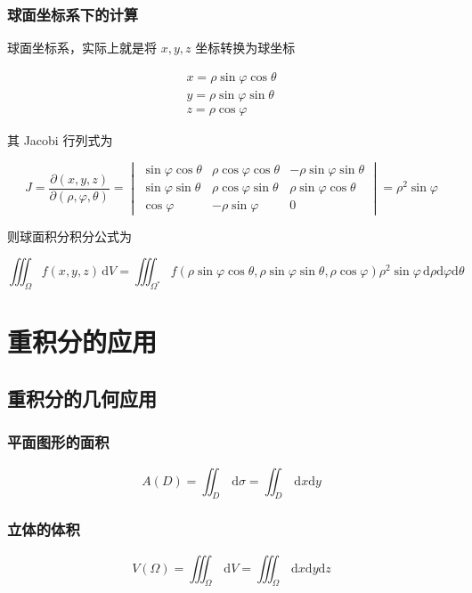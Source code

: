\documentclass[lang = zh , final , oneside , openany , titlepage , zihao = -4 , linespread = 1.3 , baselineskip = false , cjk-font = windows , text-font = newtx , math-font = newtx , math-style = ISO , uppercase-greek = upright , integral-limits = false]{sjtureport}
\begin{document}
\subsubsection{球面坐标系下的计算}

球面坐标系，实际上就是将 \(x,y,z\) 坐标转换为球坐标

\[\begin{aligned}
x = \rho\sin\varphi\cos\theta\\
y = \rho\sin\varphi\sin\theta\\
z = \rho\cos\varphi
\end{aligned}\]

其 Jacobi 行列式为

\[J = \frac{\partial (x,y,z)}{\partial (\rho,\varphi,\theta)} = \begin{vmatrix}
\sin\varphi\cos\theta & \rho\cos\varphi\cos\theta & -\rho\sin\varphi\sin\theta\\
\sin\varphi\sin\theta & \rho\cos\varphi\sin\theta & \rho\sin\varphi\cos\theta\\
\cos\varphi & -\rho\sin\varphi & 0
\end{vmatrix} = \rho^2\sin\varphi\]

则球面积分积分公式为

\[\iiint_\Omega f(x,y,z)\,\mathrm{d}V = \iiint_{\Omega^*} f(\rho\sin\varphi\cos\theta,\rho\sin\varphi\sin\theta,\rho\cos\varphi)\rho^2\sin\varphi\,\mathrm{d}\rho\mathrm{d}\varphi\mathrm{d}\theta\]

\section{重积分的应用}

\subsection{重积分的几何应用}

\subsubsection{平面图形的面积}

\[A(D) = \iint_D \,\mathrm{d}\sigma = \iint_D \,\mathrm{d}x\mathrm{d}y\]

\subsubsection{立体的体积}

\[V(\Omega) = \iiint_\Omega \,\mathrm{d}V = \iiint_\Omega \,\mathrm{d}x\mathrm{d}y\mathrm{d}z\]
\end{document}
